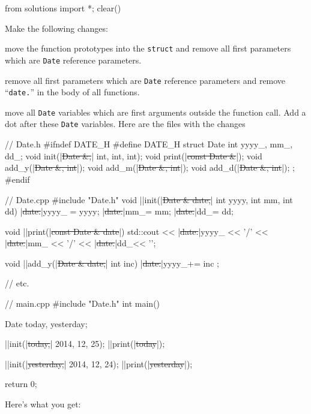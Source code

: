\begin{python0}
from solutions import *; clear()
\end{python0}

Make the following changes:

\texttt{}\EMPHASIZE{:} move the function
prototypes into the \texttt{struct} and remove all first parameters which
are \texttt{Date} reference parameters.

\texttt{}\EMPHASIZE{:} remove all first
parameters which are \texttt{Date} reference parameters and remove
``\texttt{date.}'' in the body of all functions.

\texttt{}\EMPHASIZE{:} move all \texttt{Date}
variables which are first arguments outside the function call. Add a dot
after these \texttt{Date} variables.
Here are the files with the changes

\begin{consolethree}[escapeinside=||]
// Date.h
#ifndef DATE_H
#define DATE_H
struct Date
{
    int yyyy_, mm_, dd_;
    void init(|\sout{Date \&,}| int, int, int);
    void print(|\sout{const Date \&}|);
    void add_y(|\sout{Date \&, int}|);
    void add_m(|\sout{Date \&, int}|);
    void add_d(|\sout{Date \&, int}|);
};
#endif
\end{consolethree}

\begin{consolethree}[escapeinside=||]
// Date.cpp
#include "Date.h"
void ||init(|\sout{Date \& date,}| int yyyy, int mm, int dd)
{
    |\sout{date.}|yyyy_ = yyyy;
    |\sout{date.}|mm_= mm;
    |\sout{date.}|dd_= dd;
}

void ||print(|\sout{const Date \& date}|)
{
    std::cout << |\sout{date.}|yyyy_ << '/'
              << |\sout{date.}|mm_ << '/'
              << |\sout{date.}|dd_<< '\n';
}

void ||add_y(|\sout{Date \& date,}| int inc)
{
    |\sout{date.}|yyyy_+= inc ;
}

// etc.
\end{consolethree}
\begin{consolethree}[escapeinside=||]
// main.cpp
#include "Date.h"
int main()
{
    Date today, yesterday;

    ||init(|\sout{today,}| 2014, 12, 25);
    ||print(|\sout{today}|);

    ||init(|\sout{yesterday,}| 2014, 12, 24);
    ||print(|\sout{yesterday}|);

    return 0;
}
\end{consolethree}
Here's what you get:

